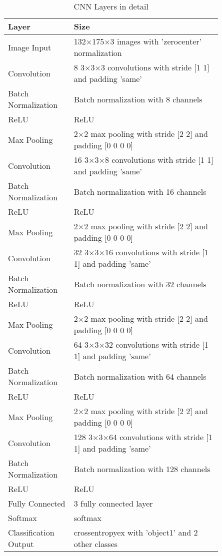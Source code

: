 \documentclass[conference]{IEEEtran}
\begin{document}


\begin{table}[!htbp]
\centering
\caption{CNN Layers in detail}
\begin{tabularx}{0.48\textwidth}{p{0.25\linewidth} | p{0.6\linewidth}}
Layer  & Size  \\
\hline
 Image Input  & 132×175×3 images with 'zerocenter' normalization \\
Convolution           & 8 3×3×3 convolutions with stride [1  1] and padding 'same' \\
Batch Normalization   & Batch normalization with 8 channels \\
ReLU                  & ReLU \\
Max Pooling           & 2×2 max pooling with stride [2  2] and padding [0  0  0  0] \\
\hline
Convolution             & 16 3×3×8 convolutions with stride [1  1] and padding 'same' \\
Batch Normalization     & Batch normalization with 16 channels \\
ReLU                    & ReLU \\
Max Pooling             & 2×2 max pooling with stride [2  2] and padding [0  0  0  0] \\
\hline
Convolution             & 32 3×3×16 convolutions with stride [1  1] and padding 'same' \\
Batch Normalization     & Batch normalization with 32 channels \\
ReLU                    & ReLU \\
Max Pooling             & 2×2 max pooling with stride [2  2] and padding [0  0  0  0] \\
\hline
Convolution             & 64 3×3×32 convolutions with stride [1  1] and padding 'same' \\
Batch Normalization     & Batch normalization with 64 channels \\
ReLU                    & ReLU \\
Max Pooling             & 2×2 max pooling with stride [2  2] and padding [0  0  0  0] \\
\hline
Convolution             & 128 3×3×64 convolutions with stride [1  1] and padding 'same' \\
Batch Normalization     & Batch normalization with 128 channels \\
ReLU                    & ReLU \\
\hline
Fully Connected         & 3 fully connected layer \\
Softmax                 & softmax \\
Classification Output   & crossentropyex with 'object1' and 2 other classes \\
\hline


\end{tabularx}%
\end{table}
\end{document}
